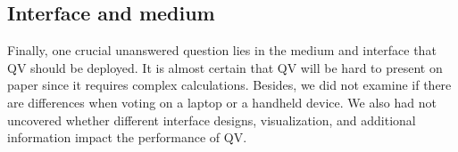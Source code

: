 \subsection{Interface and medium}
Finally, one crucial unanswered question lies in the medium and interface that QV should be deployed.
It is almost certain that QV will be hard to present on paper since it requires complex calculations. 
Besides, we did not examine if there are differences when voting on a laptop or a handheld device.
We also had not uncovered whether different interface designs, visualization, and additional information impact the performance of QV.

